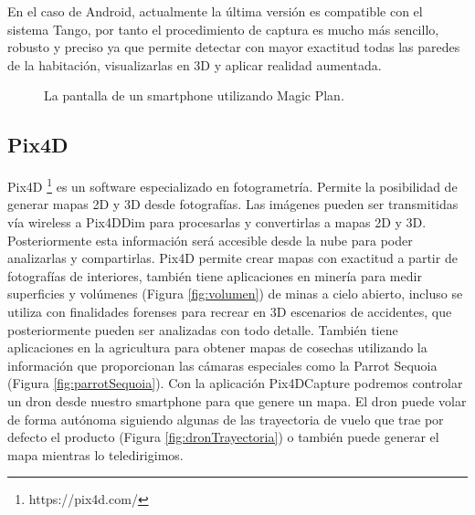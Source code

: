 En el caso de Android, actualmente la última versión es compatible con el sistema Tango, por tanto el procedimiento de captura es mucho más sencillo, robusto y preciso  ya que  permite detectar con mayor exactitud todas las paredes de la habitación, visualizarlas en 3D y aplicar realidad aumentada.

\begin{figure}[htbp]
\begin{center}
\end{center}
\caption{La pantalla de un smartphone utilizando Magic Plan. }
\end{figure}

\subsection{Pix4D}
Pix4D \footnote{https://pix4d.com/} es un software especializado en fotogrametría. Permite la posibilidad de generar mapas 2D y 3D desde fotografías. Las imágenes pueden ser transmitidas vía wireless a Pix4DDim para procesarlas y convertirlas a mapas 2D y 3D.  Posteriormente esta información será accesible desde la nube para poder analizarlas y compartirlas.
Pix4D permite crear mapas con exactitud a partir de fotografías de interiores, también tiene aplicaciones en minería para medir superficies y volúmenes (Figura \ref{fig:volumen}) de minas a cielo abierto, incluso se utiliza con finalidades forenses para recrear en 3D escenarios de accidentes, que posteriormente pueden ser analizadas con todo detalle.
También tiene aplicaciones en la agricultura para obtener mapas de cosechas utilizando la información que proporcionan las cámaras especiales como la Parrot Sequoia (Figura \ref{fig:parrotSequoia}).
Con la aplicación Pix4DCapture podremos controlar un dron desde nuestro smartphone para que genere un mapa. El dron puede volar de forma autónoma siguiendo algunas de las trayectoria de vuelo que trae por defecto el producto (Figura \ref{fig:dronTrayectoria}) o también puede generar el mapa mientras lo teledirigimos.

